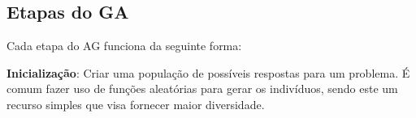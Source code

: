 \begin{minipage}{\linewidth}
	\label{fig:EstruturaAG}
\end{minipage}

\subsection{Etapas do GA}

Cada etapa do AG funciona da seguinte forma:

\textbf{Inicialização}: Criar uma população de possíveis respostas para um problema. 
É comum fazer uso de funções aleatórias para gerar os indivíduos, sendo este um recurso simples que visa fornecer maior diversidade.

